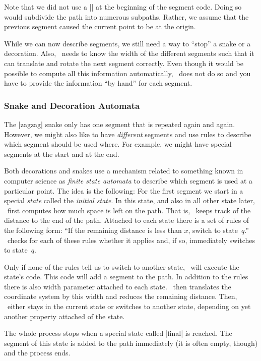 Note that we did not use a |\pgfpathmoveto{\pgfpointorigin}| at the
beginning of the segment code. Doing so would subdivide the path into
numerous subpaths. Rather, we assume that the previous segment caused
the current point to be at the origin.

While we can now describe segments, we still need a way to ``stop''
a snake or a decoration. Also, \pgfname\ needs to know the width of 
the different segments such that it can translate and rotate the 
next segment correctly.
Even though it would be possible to compute all this information
automatically, \pgfname\ does not do so and you have to provide the
information ``by hand'' for each segment. 


\subsubsection{Snake and Decoration Automata}

The |zagzag| snake only has one segment that is repeated again and
again. However, we might also like to have \emph{different} segments
and use rules to describe which segment should be used where. For
example, we might have special segments at the start and at the end.

Both decorations and snakes use a mechanism related to something known
in computer science as \emph{finite state automata} to describe which
segment is used at a particular point. The idea is the following: For
the first segment we 
start in a special \emph{state} called the \emph{initial state}. In
this state, and also in all other state later, \pgfname\ first
computes how much space is left on the path. That is, \pgfname\ keeps
track of the distance to the end of the path. Attached to each state 
there is a set of rules of the following form: ``If the remaining 
distance is less than $x$, switch to state~$q$.'' \pgfname\ checks 
for each of these rules whether it applies and, if so, immediately 
switches to state~$q$.

Only if none of the rules tell us to switch to another
state, \pgfname\ will execute the state's code. This code will add a
segment to the path. In addition to the rules there is also width
parameter attached to each state. \pgfname\ then translates the
coordinate system by this width and reduces the remaining distance.
Then, \pgfname\ either stays in the current state or switches to
another state, depending on yet another property attached of the
state.

The whole process stops when a special state called |final| is
reached. The segment of this state is added to the path immediately
(it is often empty, though) and the process ends.


